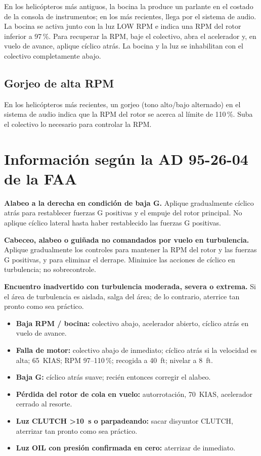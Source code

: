 En los helicópteros más antiguos, la bocina la produce un parlante en el costado de la consola de instrumentos; en los más recientes, llega por el sistema de audio. La bocina se activa junto con la luz \textsf{LOW RPM} e indica una RPM del rotor inferior a 97\,\%. Para recuperar la RPM, baje el colectivo, abra el acelerador y, en vuelo de avance, aplique cíclico atrás. La bocina y la luz se inhabilitan con el colectivo completamente abajo.

\subsection{Gorjeo de alta RPM}

En los helicópteros más recientes, un gorjeo (tono alto/bajo alternado) en el sistema de audio indica que la RPM del rotor se acerca al límite de 110\,\%. Suba el colectivo lo necesario para controlar la RPM.

\section{Información según la AD 95-26-04 de la FAA}

\begin{pasos}
\item \textbf{Alabeo a la derecha en condición de baja G.} Aplique gradualmente cíclico atrás para restablecer fuerzas G positivas y el empuje del rotor principal. No aplique cíclico lateral hasta haber restablecido las fuerzas G positivas.
\item \textbf{Cabeceo, alabeo o guiñada no comandados por vuelo en turbulencia.} Aplique gradualmente los controles para mantener la RPM del rotor y las fuerzas G positivas, y para eliminar el derrape. Minimice las acciones de cíclico en turbulencia; no sobrecontrole.
\item \textbf{Encuentro inadvertido con turbulencia moderada, severa o extrema.} Si el área de turbulencia es aislada, salga del área; de lo contrario, aterrice tan pronto como sea práctico.
\end{pasos}

\begin{insightbox}
\begin{itemize}
\item \textbf{Baja RPM / bocina:} colectivo abajo, acelerador abierto, cíclico atrás en vuelo de avance.
\item \textbf{Falla de motor:} colectivo abajo de inmediato; cíclico atrás si la velocidad es alta; 65~KIAS; RPM 97--110\,\%; recogida a 40~ft; nivelar a 8~ft.
\item \textbf{Baja G:} cíclico atrás suave; recién entonces corregir el alabeo.
\item \textbf{Pérdida del rotor de cola en vuelo:} autorrotación, 70~KIAS, acelerador cerrado al resorte.
\item \textbf{Luz \textsf{CLUTCH} >10~s o parpadeando:} sacar disyuntor \textsf{CLUTCH}, aterrizar tan pronto como sea práctico.
\item \textbf{Luz \textsf{OIL} con presión confirmada en cero:} aterrizar de inmediato.
\end{itemize}
\end{insightbox}
